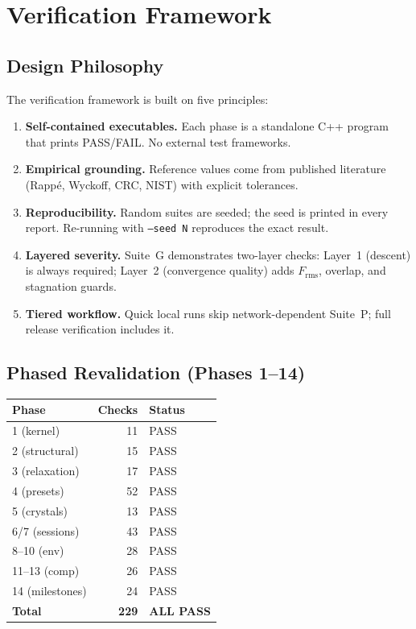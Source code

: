 \documentclass[11pt,twoside]{article}
\newcommand{\Frms}{F_{\mathrm{rms}}}
\begin{document}
\section{Verification Framework}
\label{sec:framework}

\subsection{Design Philosophy}

The verification framework is built on five principles:
\begin{enumerate}
  \item \textbf{Self-contained executables.}  Each phase is a standalone C++
        program that prints PASS/FAIL.  No external test frameworks.
  \item \textbf{Empirical grounding.}  Reference values come from published
        literature (Rapp\'{e}, Wyckoff, CRC, NIST) with explicit tolerances.
  \item \textbf{Reproducibility.}  Random suites are seeded; the seed is
        printed in every report.  Re-running with \texttt{--seed N}
        reproduces the exact result.
  \item \textbf{Layered severity.}  Suite~G demonstrates two-layer checks:
        Layer~1 (descent) is always required; Layer~2 (convergence quality)
        adds $\Frms$, overlap, and stagnation guards.
  \item \textbf{Tiered workflow.}  Quick local runs skip network-dependent
        Suite~P; full release verification includes it.
\end{enumerate}

\subsection{Phased Revalidation (Phases 1--14)}

\begin{center}
\begin{tabular}{lrl}
\toprule
\textbf{Phase} & \textbf{Checks} & \textbf{Status} \\
\midrule
1 (kernel)      & 11  & PASS \\
2 (structural)  & 15  & PASS \\
3 (relaxation)  & 17  & PASS \\
4 (presets)     & 52  & PASS \\
5 (crystals)    & 13  & PASS \\
6/7 (sessions)  & 43  & PASS \\
8--10 (env)     & 28  & PASS \\
11--13 (comp)   & 26  & PASS \\
14 (milestones) & 24  & PASS \\
\midrule
\textbf{Total}  & \textbf{229} & \textbf{ALL PASS} \\
\bottomrule
\end{tabular}
\end{center}
\end{document}

